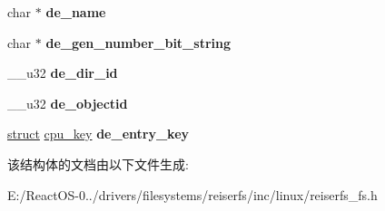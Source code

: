 \begin{DoxyCompactItemize}
char $\ast$ {\bfseries de\+\_\+name}
\item 
\mbox{\label{structreiserfs__dir__entry_ada87fb9bc5b0d9192cfda88f67592610}} 
char $\ast$ {\bfseries de\+\_\+gen\+\_\+number\+\_\+bit\+\_\+string}
\item 
\mbox{\label{structreiserfs__dir__entry_a9a35fb05122f067abcf6189c2e95876d}} 
\+\_\+\+\_\+u32 {\bfseries de\+\_\+dir\+\_\+id}
\item 
\mbox{\label{structreiserfs__dir__entry_a47bfbf176548fcbe232653934187eba7}} 
\+\_\+\+\_\+u32 {\bfseries de\+\_\+objectid}
\item 
\mbox{\label{structreiserfs__dir__entry_a56d46cae3bb12623849562f882f33e80}} 
\hyperlink{interfacestruct}{struct} \hyperlink{structcpu__key}{cpu\+\_\+key} {\bfseries de\+\_\+entry\+\_\+key}
\end{DoxyCompactItemize}


该结构体的文档由以下文件生成\+:\begin{DoxyCompactItemize}
\item 
E\+:/\+React\+O\+S-\/0../drivers/filesystems/reiserfs/inc/linux/reiserfs\+\_\+fs.\+h\end{DoxyCompactItemize}
